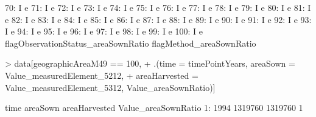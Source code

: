 \documentclass[nojss]{jss}
\begin{document}
\begin{Schunk}
\begin{Soutput}
 70:                                   I                        e
 71:                                   I                        e
 72:                                   I                        e
 73:                                   I                        e
 74:                                   I                        e
 75:                                   I                        e
 76:                                   I                        e
 77:                                   I                        e
 78:                                   I                        e
 79:                                   I                        e
 80:                                   I                        e
 81:                                   I                        e
 82:                                   I                        e
 83:                                   I                        e
 84:                                   I                        e
 85:                                   I                        e
 86:                                   I                        e
 87:                                   I                        e
 88:                                   I                        e
 89:                                   I                        e
 90:                                   I                        e
 91:                                   I                        e
 92:                                   I                        e
 93:                                   I                        e
 94:                                   I                        e
 95:                                   I                        e
 96:                                   I                        e
 97:                                   I                        e
 98:                                   I                        e
 99:                                   I                        e
100:                                   I                        e
     flagObservationStatus_areaSownRatio flagMethod_areaSownRatio
\end{Soutput}
\begin{Sinput}
> data[geographicAreaM49 == 100,
+      .(time = timePointYears, areaSown = Value_measuredElement_5212,
+        areaHarvested = Value_measuredElement_5312, Value_areaSownRatio)]
\end{Sinput}
\begin{Soutput}
    time areaSown areaHarvested Value_areaSownRatio
 1: 1994  1319760       1319760                   1

\end{Soutput}
\end{Schunk}
\end{document}
